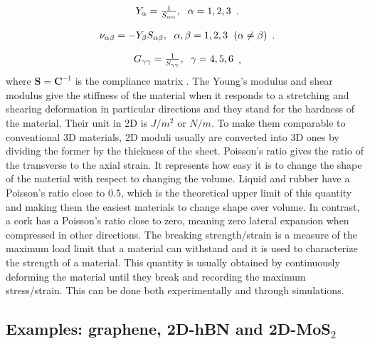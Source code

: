 \begin{equation}
\begin{array}{c}

Y_\alpha=\frac{1}{S_{\alpha\alpha}},\hspace{6 pt} \alpha = 1, 2, 3
\end{array}.
\end{equation}

\begin{equation}
\begin{array}{c}
\nu_{\alpha\beta}=-Y_\beta S_{\alpha\beta},\hspace{6 pt} \alpha, \beta = 1, 2, 3 
\hspace{6 pt}(\alpha\neq\beta)
\end{array}.
\end{equation}

\begin{equation}
\begin{array}{c}
G_{\gamma\gamma}=\frac{1}{S_{\gamma\gamma}} ,\hspace{6 pt} \gamma = 4, 5, 6
\end{array},
\end{equation}
where $\boldsymbol{S}=\boldsymbol{C}^{-1}$ is the compliance matrix \citep[e.g.][]{nye1985physical}. The Young's modulus and shear modulus give the stiffness of the material when it responds to a stretching and shearing deformation in particular directions and they stand for the hardness of the material. Their unit in 2D is $J/m^2$ or $N/m$. To make them comparable to conventional 3D materials, 2D moduli usually are converted into 3D ones by dividing the former by the thickness of the sheet. Poisson's ratio gives the ratio of the transverse to the axial strain. It represents how easy it is to change the shape of the material with respect to changing the volume. Liquid and rubber have a Poisson's ratio close to 0.5, which is the theoretical upper limit of this quantity and making them the easiest materials to change shape over volume. In contrast, a cork has a Poisson's ratio close to zero, meaning zero lateral expansion when compressed in other directions. The breaking strength/strain is a measure of the maximum load limit that a material can withstand and it is used to characterize the strength of a material. This quantity is usually obtained by continuously deforming the material until they break and recording the maximum stress/strain. This can be done both experimentally and through simulations. 

\subsection{Examples: graphene, 2D-hBN and 2D-MoS$_2$}

